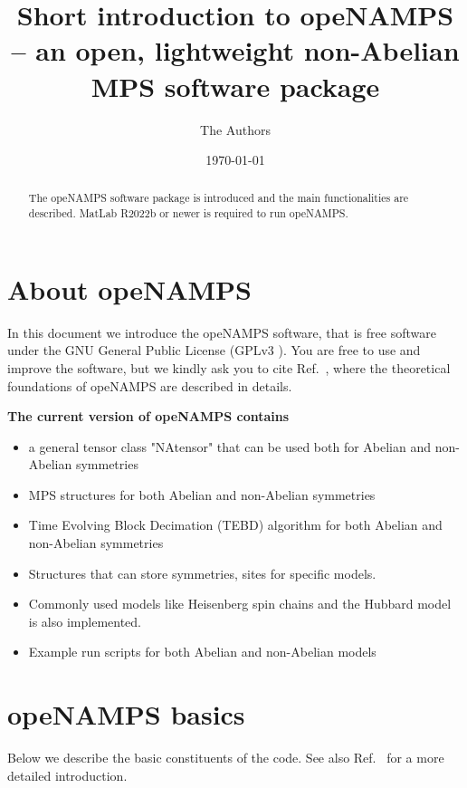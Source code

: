 \documentclass[aps,prb,twocolumn,showpacs,preprintnumbers,amsmath,amssymb, superscriptaddressm, nofootinbib]{revtex4-2}   %
\begin{document}
\title{Short introduction to \textbf{opeNAMPS} -- an open, lightweight non-Abelian MPS software package}

\author{The Authors}
\date{\today}
 
\begin{abstract}
 The opeNAMPS software package is introduced and the main functionalities are described. MatLab R2022b or newer is required to run opeNAMPS. 

\end{abstract}
\maketitle

\section{About opeNAMPS}
In this document we introduce the opeNAMPS software, that is free software under the GNU General Public License (GPLv3 \cite{GPLv3}). You are free to use and improve the software, but we kindly ask you to cite Ref.~, where the theoretical foundations of opeNAMPS are described in details.  

\textbf{The current version of opeNAMPS contains} 
\begin{itemize}
    \item a general tensor class "NAtensor" that can be used both for Abelian and non-Abelian symmetries
    \item MPS structures for both Abelian and non-Abelian symmetries
    \item Time Evolving Block Decimation (TEBD) algorithm for both Abelian and non-Abelian symmetries
    \item Structures that can store symmetries, sites for specific models.
    \item Commonly used models like Heisenberg spin chains and the Hubbard model is also implemented.
    \item Example run scripts for both Abelian and non-Abelian models
\end{itemize}

\section{opeNAMPS basics}
Below we describe the basic constituents of the code. See also Ref.~ for a more detailed introduction. 
\end{document}
